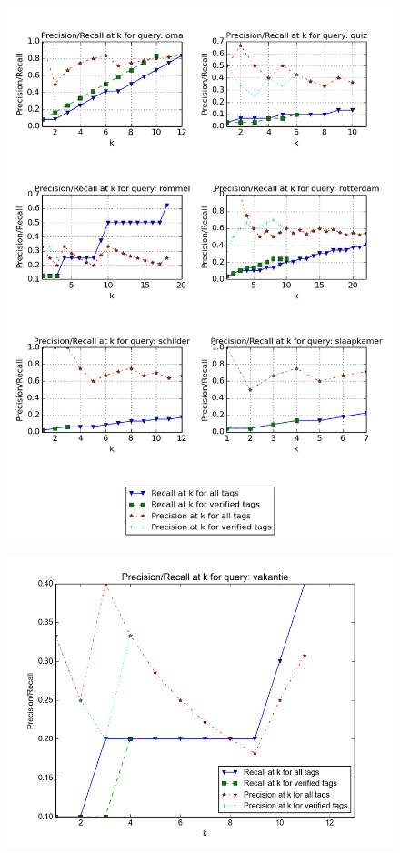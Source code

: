 \begin{figure}[H]
\centering
\includegraphics[width=\textwidth]{appendixa/queries31}
\end{figure}

\begin{figure}[H]
\includegraphics[width=\textwidth]{appendixa/queries43}
\end{figure}